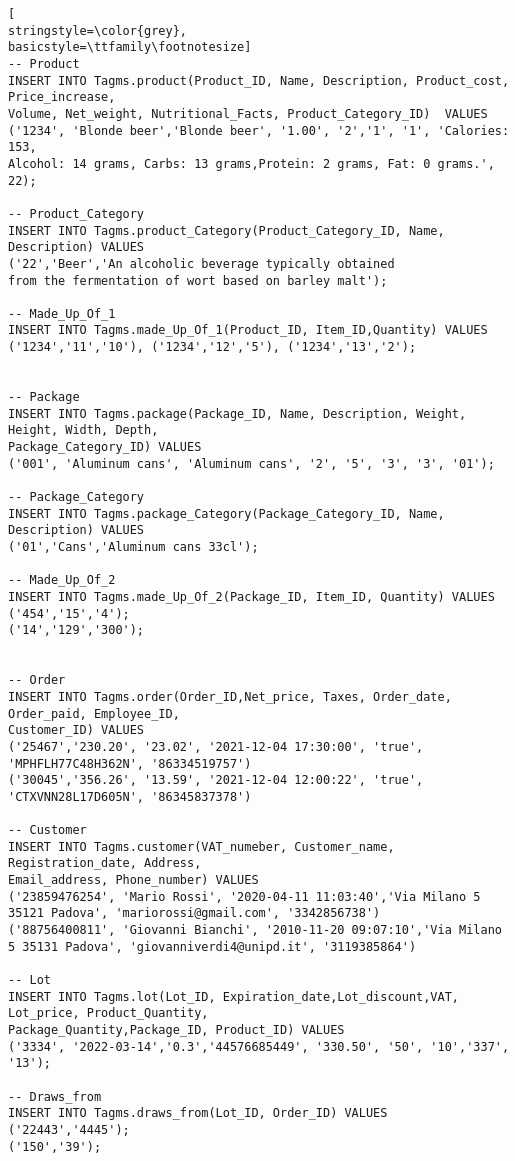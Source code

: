 \begin{lstlisting}[
stringstyle=\color{grey},
basicstyle=\ttfamily\footnotesize]
-- Product
INSERT INTO Tagms.product(Product_ID, Name, Description, Product_cost, Price_increase,
Volume, Net_weight, Nutritional_Facts, Product_Category_ID)  VALUES 
('1234', 'Blonde beer','Blonde beer', '1.00', '2','1', '1', 'Calories: 153, 
Alcohol: 14 grams, Carbs: 13 grams,Protein: 2 grams, Fat: 0 grams.', 22);

-- Product_Category
INSERT INTO Tagms.product_Category(Product_Category_ID, Name, Description) VALUES 
('22','Beer','An alcoholic beverage typically obtained 
from the fermentation of wort based on barley malt');

-- Made_Up_Of_1
INSERT INTO Tagms.made_Up_Of_1(Product_ID, Item_ID,Quantity) VALUES
('1234','11','10'), ('1234','12','5'), ('1234','13','2');


-- Package
INSERT INTO Tagms.package(Package_ID, Name, Description, Weight, Height, Width, Depth, 
Package_Category_ID) VALUES
('001', 'Aluminum cans', 'Aluminum cans', '2', '5', '3', '3', '01');

-- Package_Category
INSERT INTO Tagms.package_Category(Package_Category_ID, Name, Description) VALUES 
('01','Cans','Aluminum cans 33cl');

-- Made_Up_Of_2
INSERT INTO Tagms.made_Up_Of_2(Package_ID, Item_ID, Quantity) VALUES
('454','15','4');
('14','129','300');


-- Order
INSERT INTO Tagms.order(Order_ID,Net_price, Taxes, Order_date, Order_paid, Employee_ID, 
Customer_ID) VALUES 
('25467','230.20', '23.02', '2021-12-04 17:30:00', 'true', 'MPHFLH77C48H362N', '86334519757')
('30045','356.26', '13.59', '2021-12-04 12:00:22', 'true', 'CTXVNN28L17D605N', '86345837378')

-- Customer
INSERT INTO Tagms.customer(VAT_numeber, Customer_name, Registration_date, Address, 
Email_address, Phone_number) VALUES
('23859476254', 'Mario Rossi', '2020-04-11 11:03:40','Via Milano 5 35121 Padova', 'mariorossi@gmail.com', '3342856738')
('88756400811', 'Giovanni Bianchi', '2010-11-20 09:07:10','Via Milano 5 35131 Padova', 'giovanniverdi4@unipd.it', '3119385864')

-- Lot
INSERT INTO Tagms.lot(Lot_ID, Expiration_date,Lot_discount,VAT, Lot_price, Product_Quantity, 
Package_Quantity,Package_ID, Product_ID) VALUES 
('3334', '2022-03-14','0.3','44576685449', '330.50', '50', '10','337', '13');

-- Draws_from
INSERT INTO Tagms.draws_from(Lot_ID, Order_ID) VALUES 
('22443','4445');
('150','39');

\end{lstlisting}